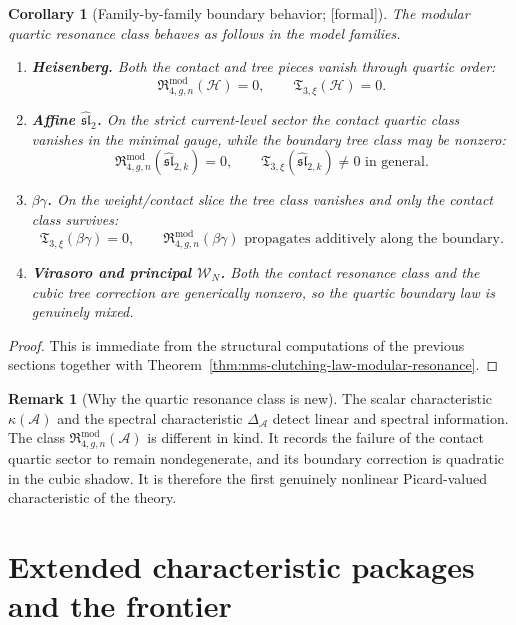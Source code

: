 \documentclass[11pt,oneside]{memoir}
\numberwithin{equation}{chapter}
\newtheorem{corollary}[theorem]{Corollary}
\theoremstyle{definition}
\newtheorem{remark}[theorem]{Remark}
\newcommand{\ClaimStatusProvedHere}{\textnormal{[formal]}}
\newcommand{\cA}{\mathcal A}
\begin{document}
\begin{corollary}[Family-by-family boundary behavior; \ClaimStatusProvedHere]
\label{cor:nms-family-boundary-behavior}
The modular quartic resonance class behaves as follows in the model families.
\begin{enumerate}[label=\textup{(\roman*)}]
\item \textbf{Heisenberg.}  Both the contact and tree pieces vanish through quartic order:
\[
\mathfrak R_{4,g,n}^{\mathrm{mod}}(\mathcal H)=0,
\qquad
\mathfrak T_{3,\xi}(\mathcal H)=0.
\]
\item \textbf{Affine $\widehat{\mathfrak{sl}}_2$.}  On the strict current-level sector the contact quartic class vanishes in the minimal gauge, while the boundary tree class may be nonzero:
\[
\mathfrak R_{4,g,n}^{\mathrm{mod}}(\widehat{\mathfrak{sl}}_{2,k})=0,
\qquad
\mathfrak T_{3,\xi}(\widehat{\mathfrak{sl}}_{2,k})\neq 0
\text{ in general.}
\]
\item \textbf{$\beta\gamma$.}  On the weight/contact slice the tree class vanishes and only the contact class survives:
\[
\mathfrak T_{3,\xi}(\beta\gamma)=0,
\qquad
\mathfrak R_{4,g,n}^{\mathrm{mod}}(\beta\gamma)
\text{ propagates additively along the boundary.}
\]
\item \textbf{Virasoro and principal $\mathcal W_N$.}  Both the contact resonance class and the cubic tree correction are generically nonzero, so the quartic boundary law is genuinely mixed.
\end{enumerate}
\end{corollary}

\begin{proof}
This is immediate from the structural computations of the previous sections together with Theorem~\ref{thm:nms-clutching-law-modular-resonance}.\qedhere
\end{proof}

\begin{remark}[Why the quartic resonance class is new]
\label{rem:nms-why-quartic-resonance-is-new}
The scalar characteristic $\kappa(\cA)$ and the spectral characteristic $\Delta_{\cA}$ detect linear and spectral information.  The class $\mathfrak R_{4,g,n}^{\mathrm{mod}}(\cA)$ is different in kind.  It records the failure of the contact quartic sector to remain nondegenerate, and its boundary correction is quadratic in the cubic shadow.  It is therefore the first genuinely nonlinear Picard-valued characteristic of the theory.
\end{remark}

\section{Extended characteristic packages and the frontier}
\label{sec:nms-extended-characteristic-packages}
\end{document}

